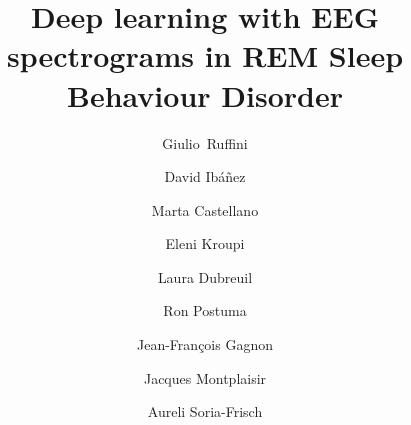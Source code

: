 \documentclass[review]{elsarticle}
\begin{document}
\begin{frontmatter}

\title{Deep learning with EEG spectrograms in REM Sleep Behaviour Disorder}


\author[mymainaddress,mysecondaryaddress]{Giulio~Ruffini}

\author[mysecondaryaddress]{David Ib\'a\~nez }


\author[mysecondaryaddress]{Marta Castellano}

\author[mysecondaryaddress]{Eleni Kroupi}

\author[mymainaddress]{Laura Dubreuil}

\author[mythirdaddress]{Ron Postuma}

\author[mythirdaddress]{Jean-Fran\c{c}ois Gagnon}

\author[mythirdaddress]{Jacques Montplaisir}

\author[mysecondaryaddress]{Aureli Soria-Frisch}

\address[mymainaddress]{Neuroelectrics Corporation, Cambridge, MA 02139}
\address[mysecondaryaddress]{Starlab Barcelona, Av. Tibidabo 47 bis, 08035 Barcelona}
\address[mythirdaddress]{Centre for Advanced Research in Sleep Medicine, H\^opital du Sacr\'e-C\oe ur de Montr\'eal, Canada}


\end{frontmatter}
\end{document}
